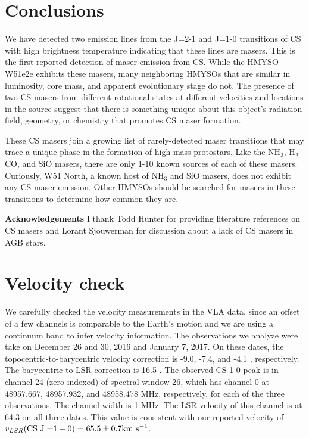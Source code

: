 \documentclass[twocolumn]{aastex62}
\begin{document}
\section{Conclusions}
We have detected two emission lines from the J=2-1 and J=1-0 transitions of CS
with high brightness temperature indicating that these lines are masers.
This is the first reported detection of maser emission from CS.
While the HMYSO W51e2e exhibits these masers, many neighboring HMYSOs that
are similar in luminosity, core mass, and apparent evolutionary stage
do not.  The presence of two CS masers from different rotational states
at different velocities and locations in the source suggest that there is something
unique about this object's radiation field, geometry, or chemistry that
promotes CS maser formation.

These CS masers join a growing list of rarely-detected maser transitions
that may trace a unique phase in the formation of high-mass protostars.
Like the NH$_3$, H$_2$CO, and SiO masers, there are only 1-10 known sources of
each of these masers.  Curiously, W51 North, a known host of NH$_3$ and SiO masers,
does not exhibit any CS maser emission.  Other HMYSOs should be searched for
masers in these transitions to determine how common they are.

\textbf{Acknowledgements}
I thank Todd Hunter for providing literature references on CS masers and Lorant
Sjouwerman for discussion about a lack of CS masers in AGB stars.

\appendix
\section{Velocity check}
We carefully checked the velocity measurements in the VLA data, since an offset
of a few channels is comparable to the Earth's motion and we are using a
continuum band to infer velocity information.  The observations we analyze were
take on December 26 and 30, 2016 and January 7, 2017.  On these dates, the
topocentric-to-barycentric velocity correction is -9.0, -7.4, and -4.1 \kms,
respectively.  The barycentric-to-LSR correction is 16.5 \kms.  The observed CS
1-0 peak is in channel 24 (zero-indexed) of spectral window 26, which has
channel 0 at  48957.667, 48957.932, and 48958.478 MHz, respectively, for each
of the three observations.  The channel width is 1 MHz.  The LSR velocity of
this channel is at 64.3 \kms on all three dates.  This value is consistent with
our reported velocity of $v_{LSR}(\mathrm{CS~J=}1-0) = 65.5 \pm 0.7 \textrm{km~s}^{-1}$.
\end{document}
